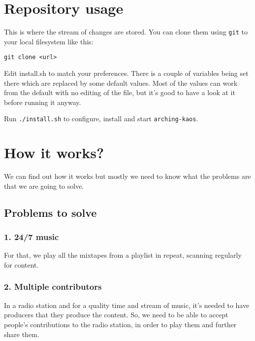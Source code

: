 \documentclass[12pt]{report}
\begin{document}
\section{Repository usage}\label{repository-usage}

This is where the stream of changes are stored. You can clone them using
\texttt{git} to your local filesystem like this:

\begin{verbatim}
git clone <url>
\end{verbatim}

Edit install.sh to match your preferences. There
is a couple of variables being set there which are replaced by some
default values. Most of the values can work from the default with no
editing of the file, but it's good to have a look at it before running
it anyway.

Run \texttt{./install.sh} to configure, install and start
\texttt{arching-kaos}.

\section{How it works?}\label{how-it-works}

We can find out how it works but mostly we need to know what the
problems are that we are going to solve.

\subsection{Problems to solve}\label{problems-to-solve}


\subsubsection{1. 24/7 music}\label{music}

For that, we play all the mixtapes from a playlist in repeat, scanning
regularly for content.


\subsubsection{2. Multiple contributors}\label{multiple-contributors}

In a radio station and for a quality time and stream of music, it's
needed to have producers that they produce the content. So, we need to
be able to accept people's contributions to the radio station, in order
to play them and further share them.
\end{document}

